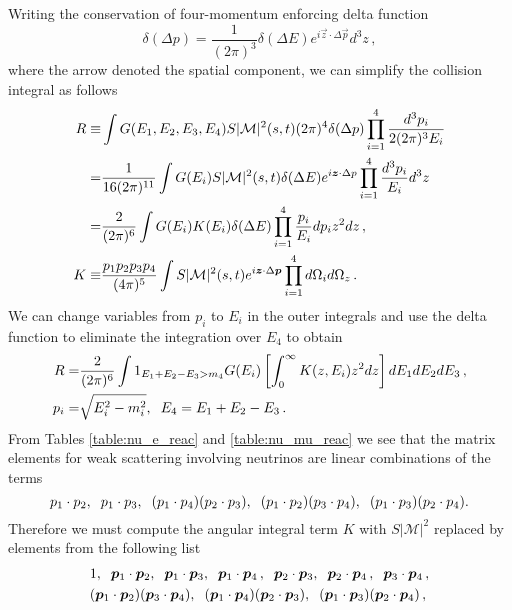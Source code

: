  Writing the conservation of four-momentum enforcing delta function
\begin{equation}
\delta(\Delta p)=\frac{1}{(2\pi)^3}\delta(\Delta E)e^{i\vec z\cdot \Delta \vec p}d^3z\,,
\end{equation}
where the arrow denoted the spatial component, we can simplify the collision integral as follows
\begin{align}
R\equiv&\int G(E_1,E_2,E_3,E_4) S|\mathcal{M}|^2(s,t)(2\pi)^4\delta(\Delta p)\prod_{i=1}^4\frac{d^3p_i}{2(2\pi)^3 E_i}\\
=&\frac{1}{16(2\pi)^{11}}\int G(E_i) S|\mathcal{M}|^2(s,t)\delta(\Delta E)e^{i\vec z\cdot\Delta p}\prod_{i=1}^4\frac{d^3p_i}{ E_i}d^3z\notag\\
=&\frac{2}{(2\pi)^{6}}\int G(E_i)K(E_i) \delta(\Delta E)\prod_{i=1}^4\frac{p_i}{E_i}dp_i z^2dz\,,\notag\\
K\equiv&\frac{p_1p_2p_3p_4}{(4\pi)^5}\int S|\mathcal{M}|^2(s,t)e^{i\vec z\cdot\Delta\vec p}\prod_{i=1}^4d\Omega_id\Omega_z\,.
\end{align}
We can change variables from $p_i$ to $E_i$ in the outer integrals and use the delta function to eliminate the integration over $E_4$ to obtain
\begin{align}
R=&\frac{2}{(2\pi)^{6}}\int1_{E_1+E_2-E_3>m_4}G(E_i)\left[\int_0^\infty K(z,E_i)z^2dz\right]dE_1dE_2dE_3\,,\\
p_i=&\sqrt{E_i^2-m_i^2},\hspace{2mm} E_4=E_1+E_2-E_3\,.\notag
\end{align}
From Tables \ref{table:nu_e_reac} and \ref{table:nu_mu_reac} we see that the matrix elements for weak scattering involving neutrinos are linear combinations of the terms
\begin{equation}
p_1\cdot p_2,\hspace{2mm} p_1\cdot p_3,\hspace{2mm}(p_1\cdot p_4)(p_2\cdot p_3), \hspace{2mm} (p_1\cdot p_2)(p_3\cdot p_4),\hspace{2mm} (p_1\cdot p_3)(p_2\cdot p_4).
\end{equation}
Therefore we must compute the angular integral term $K$ with $S|\mathcal{M}|^2$ replaced by elements from the following list
\begin{align}\label{matrix_element_pieces}
&1,\hspace{2mm}\vec p_1 \cdot\vec p_2,\hspace{2mm}\vec p_1 \cdot\vec p_3,\hspace{2mm}\vec p_1 \cdot\vec p_4 \,,\hspace{2mm}\vec p_2\cdot\vec p_3,\hspace{2mm}\vec p_2\cdot\vec p_4 \,,\hspace{2mm}\vec p_3\cdot\vec p_4 \,,\\
& (\vec p_1 \cdot\vec p_2)(\vec p_3\cdot\vec p_4 ),\hspace{2mm}(\vec p_1 \cdot\vec p_4 )(\vec p_2\cdot\vec p_3),\hspace{2mm} (\vec p_1 \cdot\vec p_3)(\vec p_2\cdot\vec p_4 )\,,\notag
\end{align}
